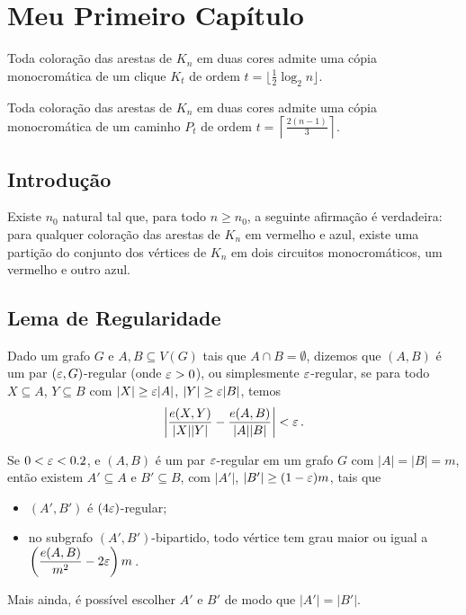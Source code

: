 \chapter{Meu Primeiro Capítulo}

\begin{teo}[Ramsey]
	Toda coloração das arestas de $K_n$ em duas cores admite uma cópia monocromática de um clique $K_t$ de ordem $t = \lfloor\frac{1}{2}\log_2n\rfloor$.
\end{teo}

\begin{teo}
	Toda coloração das arestas de $K_n$ em duas cores admite uma cópia monocromática de um caminho $P_t$ de ordem $t = \left\lceil\frac{2(n-1)}{3}\right\rceil$.
\end{teo}



\section{Introdução}

\begin{teo}
  \label{teo_principal}
  Existe $n_0$ natural tal que, para todo $n\geq n_0$, a seguinte afirmação é verdadeira: para qualquer coloração das arestas de $K_n$ em vermelho e azul, existe uma partição do conjunto dos vértices de $K_n$ em dois circuitos monocromáticos, um vermelho e outro azul.
\end{teo}

\section{Lema de Regularidade}

\begin{defi}
	Dado um grafo $G$ e $A, B \subseteq V(G)$ tais que $A\cap B = \emptyset$, dizemos que $(A,B)$ é um par $(\varepsilon,G)$-regular (onde $\varepsilon>0$), ou simplesmente $\varepsilon$-regular, se para todo $X\subseteq A$, $Y\subseteq B$ com $\lvert X\rvert\geq\varepsilon\lvert A\rvert$, $\lvert Y\rvert\geq\varepsilon\lvert B\rvert$, temos
	\[
	\left\lvert \frac{e(X,Y)}{\lvert X\rvert\lvert Y\rvert} - \frac{e(A,B)}{\lvert A\rvert\lvert B\rvert}\right\rvert < \varepsilon\,.
	\]
\end{defi}

\begin{prop}
	\label{prop:remocao_de_grau_pequeno}
	Se $0<\varepsilon<0.2$, e $(A,B)$ é um par $\varepsilon$-regular em um grafo $G$ com $|A| = |B| = m$, então existem $A'\subseteq A$ e $B'\subseteq B$, com $\lvert A'\rvert$, $\lvert B'\rvert\geq(1-\varepsilon)m$, tais que
	\begin{itemize}
		\item $(A', B')$ é $(4\varepsilon)$-regular;
		\item no subgrafo $(A', B')$-bipartido, todo vértice tem grau maior ou igual a $\left(\dfrac{e(A,B)}{m^2} -2\varepsilon\right)m$\,.
	\end{itemize}
	Mais ainda, é possível escolher $A'$ e $B'$ de modo que $|A'| = |B'|$.
\end{prop}

